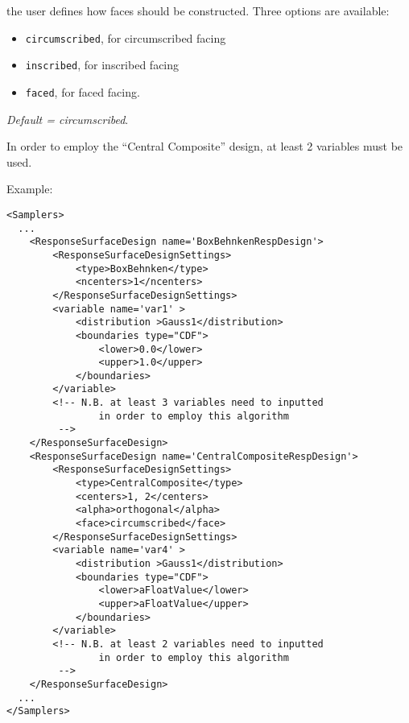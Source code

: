 \begin{itemize}
\begin{itemize}
\begin{itemize}
            the user defines how faces should be constructed.
            Three options are available:
            \begin{itemize}
              \item \texttt{circumscribed}, for circumscribed facing
              \item \texttt{inscribed}, for inscribed facing
              \item \texttt{faced}, for faced facing.
            \end{itemize}
            \textit{Default = circumscribed}.
         \end{itemize}
      \end{itemize}
      \nb In order to employ the ``Central Composite'' design, at least 2
      variables must be used.
    \end{itemize}



Example:
\begin{lstlisting}[style=XML,morekeywords={}]
<Samplers>
  ...
    <ResponseSurfaceDesign name='BoxBehnkenRespDesign'>
        <ResponseSurfaceDesignSettings>
            <type>BoxBehnken</type>
            <ncenters>1</ncenters>
        </ResponseSurfaceDesignSettings>
        <variable name='var1' >
            <distribution >Gauss1</distribution>
            <boundaries type="CDF">
                <lower>0.0</lower>
                <upper>1.0</upper>
            </boundaries>
        </variable>
        <!-- N.B. at least 3 variables need to inputted 
                in order to employ this algorithm
         -->
    </ResponseSurfaceDesign>
    <ResponseSurfaceDesign name='CentralCompositeRespDesign'>
        <ResponseSurfaceDesignSettings>
            <type>CentralComposite</type>
            <centers>1, 2</centers>
            <alpha>orthogonal</alpha>
            <face>circumscribed</face>
        </ResponseSurfaceDesignSettings>
        <variable name='var4' >
            <distribution >Gauss1</distribution>
            <boundaries type="CDF">
                <lower>aFloatValue</lower>
                <upper>aFloatValue</upper>
            </boundaries>
        </variable>
        <!-- N.B. at least 2 variables need to inputted 
                in order to employ this algorithm
         -->        
    </ResponseSurfaceDesign>
  ...
</Samplers>
\end{lstlisting}

